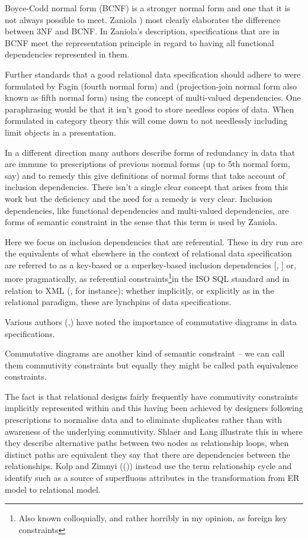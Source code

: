 \documentclass[10pt,a4paper]{article}
\theoremstyle{remark}
\begin{document}
\note Boyce-Codd normal form (BCNF) is a stronger normal form and one that it is not always possible to meet. Zaniola \cite{zaniolo1982}) most clearly elaborates the difference between 3NF and BCNF. 
In Zaniola's description, specifications that are in BCNF meet the representation principle in regard to having all functional dependencies represented in them.

\note Further standards that a good relational data specification should adhere to were formulated by Fagin \cite{Fagin1977} (fourth normal form) and  \cite{Fagin1979} (projection-join normal form also known as fifth normal form)
using the concept of multi-valued dependencies. 
One paraphrasing would be that it isn't good to store needless copies of data. 
When formulated in category theory this will come down to not needlessly including limit objects in a presentation.

\note In a different direction many authors describe forms of redundancy in data that are immune to prescriptions
of previous normal forms (up to 5th normal form, say) and to remedy this give definitions of normal forms that
take account of inclusion dependencies.
There isn't a single clear concept that arises from this work but the deficiency and the need for a remedy is very clear.  
Inclusion dependencies, like functional dependencies and multi-valued dependencies, are forms of semantic constraint in the sense that this term is used by Zaniola. 

\note Here we focus on inclusion dependencies that are referential. These in dry run are the equivalents of what elsewhere in the context of relational data specification are referred to as a key-based or a superkey-based inclusion dependencies [\cite{Mannila1986}, \cite{Levene2000}]
or, more pragmatically, as referential constraints\footnote{	Also known colloquially, and rather horribly in my opinion, as foreign key constraints}in the ISO SQL standard\cite{ISOSQL2016} and in relation to XML
(\cite{fan2003}, for instance); whether implicitly, or explicitly as in the relational paradigm, these are lynchpins of  data specifications.

\note Various authors (\cite{CartmellScopePaper},\cite{Johnson93}) have noted the importance of commutative diagrams in data specifications.
\begin{newtt}Commutative diagrams are another kind of semantic constraint -- we can call them commutivity constraints but equally they might be called path equivalence constraints.\end{newtt}  The fact is that relational designs fairly frequently have commutivity constraints implicitly represented within  and this having been achieved  by designers following prescriptions to normalise data and to eliminate duplicates rather than with awareness of the underlying commutivity. 
Shlaer and Lang illustrate this in \cite{Shlaer96} where they describe alternative paths between two nodes as
relationship loops, when distinct paths are equivalent they say that there are dependencies
between the relationships. Kolp and Zimnyi ((\cite{Kolp1995})) instead use the term
relationship cycle and identify such as a source of superfluous attributes in the
transformation from ER model to relational model.
\end{document}
